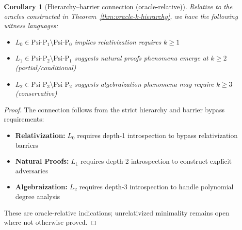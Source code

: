\documentclass[11pt]{article}
\newtheorem{corollary}[theorem]{Corollary}
\theoremstyle{plain}
\theoremstyle{definition}
\begin{document}
\begin{corollary}[Hierarchy--barrier connection (oracle-relative)]
Relative to the oracles constructed in Theorem~\ref{thm:oracle-k-hierarchy}, we have the following witness languages:
\begin{itemize}
    \item $L_0 \in \text{Psi-P}_1 \setminus \text{Psi-P}_0$ 
          implies relativization requires $k \geq 1$
    \item $L_1 \in \text{Psi-P}_2 \setminus \text{Psi-P}_1$ 
          suggests natural proofs phenomena emerge at $k \geq 2$ (partial/conditional)  
    \item $L_2 \in \text{Psi-P}_3 \setminus \text{Psi-P}_2$ 
          suggests algebraization phenomena may require $k \geq 3$ (conservative)
\end{itemize}
\end{corollary}

\begin{proof}
The connection follows from the strict hierarchy and barrier bypass requirements:
\begin{itemize}
    \item \textbf{Relativization:} $L_0$ requires depth-1 introspection to bypass relativization barriers
    \item \textbf{Natural Proofs:} $L_1$ requires depth-2 introspection to construct explicit adversaries
    \item \textbf{Algebraization:} $L_2$ requires depth-3 introspection to handle polynomial degree analysis
\end{itemize}
These are oracle-relative indications; unrelativized minimality remains open where not otherwise proved.
\end{proof}
\end{document}
